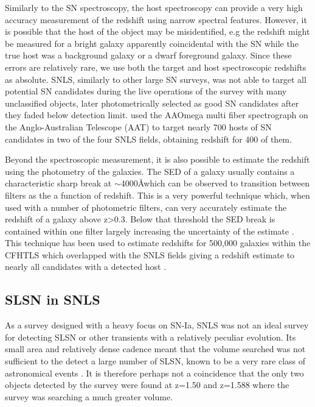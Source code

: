 Similarly to the SN spectroscopy, the host spectroscopy can provide a very high accuracy measurement of the redshift using narrow spectral features. However, it is possible that the host of the object may be misidentified, e.g the redshift might be measured for a bright galaxy apparently coincidental with the SN while the true host was a background galaxy or a dwarf foreground galaxy. Since these errors are relatively rare, we use both the target and host spectroscopic redshifts as absolute. SNLS, similarly to other large SN surveys, was not able to target all potential SN candidates during the live operations of the survey with many unclassified objects, later photometrically selected as good SN candidates after they faded below detection limit. \citet{Lidman2012} used the AAOmega multi fiber spectrograph on the Anglo-Australian Telescope (AAT) to target nearly 700 hosts of SN candidates in two of the four SNLS fields, obtaining redshift for 400 of them.

Beyond the spectroscopic measurement, it is also possible to estimate the redshift using the photometry of the galaxies. The SED of a galaxy usually contains a characteristic sharp break at $\sim$4000\AA which can be observed to transition between filters as the a function of redshift. This is a very powerful technique which, when used with a number of photometric filters, can very accurately estimate the redshift of a galaxy above z>0.3. Below that threshold the SED break is contained within one filter largely increasing the uncertainty of the estimate \citep{Connolly1995}. This technique has been used to estimate redshifts for 500,000 galaxies within the CFHTLS which overlapped with the SNLS fields giving a redshift estimate to nearly all candidates with a detected host \citep{Ilbert2006}.

\subsection{SLSN in SNLS}
As a survey designed with a heavy focus on SN-Ia, SNLS was not an ideal survey for detecting SLSN or other transients with a relatively peculiar evolution. Its small area and relatively dense cadence meant that the volume searched was not sufficient to the detect a large number of SLSN, known to be a very rare class of astronomical events \citep{Cooke2012,Prajs2016,Quimby2013}. It is therefore perhaps not a coincidence that the only two objects detected by the survey were found at z=1.50 and z=1.588 where the survey was searching a much greater volume.

